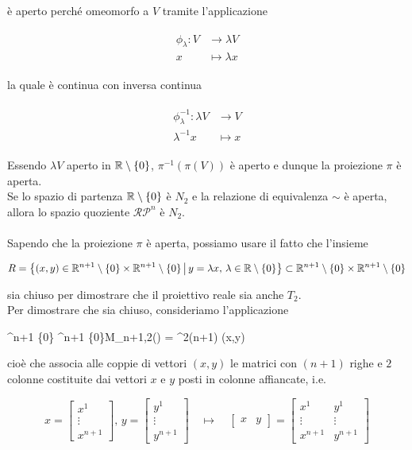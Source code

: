 è aperto perché omeomorfo a $ V $ tramite l'applicazione

\begin{align}
	\begin{split}
		\phi_{\lambda} : V &\to \lambda V\\
		x &\mapsto \lambda x
	\end{split}
\end{align}

la quale è continua con inversa continua

\begin{align}
	\begin{split}
		\phi_{\lambda}^{-1} : \lambda V &\to V\\
		\lambda^{-1} x &\mapsto x
	\end{split}
\end{align}

Essendo $ \lambda V $ aperto in $ \mathbb{R} \setminus \{0\} $, $ \pi^{-1}(\pi(V)) $ è aperto e dunque la proiezione $ \pi $ è aperta.\\
Se lo spazio di partenza $ \mathbb{R} \setminus \{0\} $ è $ N_{2} $ e la relazione di equivalenza $ \sim $ è aperta, allora lo spazio quoziente $ \mathcal{RP}^{n} $ è $ N_{2} $.\\\\
%
Sapendo che la proiezione $ \pi $ è aperta, possiamo usare il fatto che l'insieme

\begin{equation}
	R = \left\{ (x,y) \in \mathbb{R}^{n+1} \setminus \{0\} \times \mathbb{R}^{n+1} \setminus \{0\} \, \middle| \, y=\lambda x, \, \lambda \in \mathbb{R} \setminus \{0\} \right\} \subset \mathbb{R}^{n+1} \setminus \{0\} \times \mathbb{R}^{n+1} \setminus \{0\}
\end{equation}

sia chiuso per dimostrare che il proiettivo reale sia anche $ T_{2} $.\\
Per dimostrare che sia chiuso, consideriamo l'applicazione

\map{\phi}%
	{\R^{n+1} \setminus \{0\} \times \R^{n+1} \setminus \{0\}}{M_{n+1,2}(\R) = \R^{2(n+1)}}%
	{(x,y)}{\mqty[x & y]}

cioè che associa alle coppie di vettori $ (x,y) $ le matrici con $ (n+1) $ righe e $ 2 $ colonne costituite dai vettori $ x $ e $ y $ posti in colonne affiancate, i.e.

\begin{equation}
	x = \begin{bmatrix} x^{1} \\ \vdots \\ x^{n+1} \end{bmatrix}, \, y = \begin{bmatrix} y^{1} \\ \vdots \\ y^{n+1} \end{bmatrix} \quad \longmapsto \quad \begin{bmatrix} x & y \end{bmatrix} = \begin{bmatrix} x^{1} & y^{1} \\ \vdots & \vdots \\ x^{n+1} & y^{n+1} \end{bmatrix}
\end{equation}

